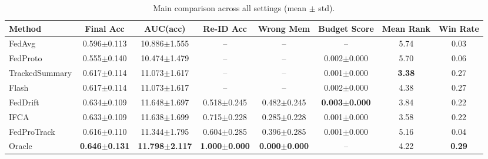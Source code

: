 \begin{table}[t]
\centering
\caption{Main comparison across all settings (mean $\pm$ std).}
\label{tab:main}
\begin{tabular}{lccccccc}
\toprule
Method & Final Acc & AUC(acc) & Re-ID Acc & Wrong Mem & Budget Score & Mean Rank & Win Rate \\
\midrule
FedAvg & 0.596$\pm$0.113 & 10.886$\pm$1.555 & -- & -- & -- & 5.74 & 0.03 \\
FedProto & 0.555$\pm$0.140 & 10.474$\pm$1.479 & -- & -- & 0.002$\pm$0.000 & 5.70 & 0.06 \\
TrackedSummary & 0.617$\pm$0.114 & 11.073$\pm$1.617 & -- & -- & 0.001$\pm$0.000 & \textbf{3.38} & 0.27 \\
Flash & 0.617$\pm$0.114 & 11.073$\pm$1.617 & -- & -- & 0.002$\pm$0.000 & 4.38 & 0.27 \\
FedDrift & 0.634$\pm$0.109 & 11.648$\pm$1.697 & 0.518$\pm$0.245 & 0.482$\pm$0.245 & \textbf{0.003$\pm$0.000} & 3.84 & 0.22 \\
IFCA & 0.633$\pm$0.109 & 11.638$\pm$1.699 & 0.715$\pm$0.228 & 0.285$\pm$0.228 & 0.001$\pm$0.000 & 3.58 & 0.22 \\
FedProTrack & 0.616$\pm$0.110 & 11.344$\pm$1.795 & 0.604$\pm$0.285 & 0.396$\pm$0.285 & 0.001$\pm$0.000 & 5.16 & 0.04 \\
Oracle & \textbf{0.646$\pm$0.131} & \textbf{11.798$\pm$2.117} & \textbf{1.000$\pm$0.000} & \textbf{0.000$\pm$0.000} & -- & 4.22 & \textbf{0.29} \\
\bottomrule
\end{tabular}
\end{table}
